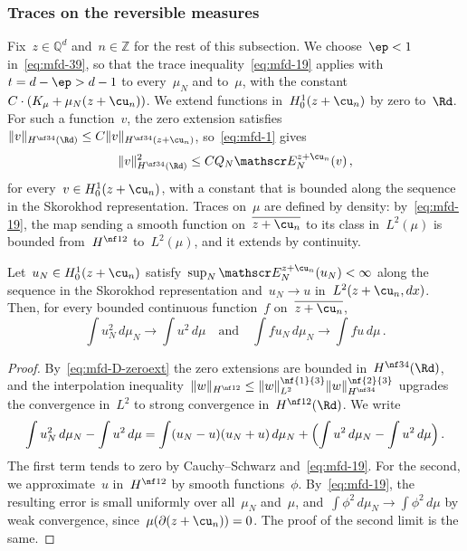 \documentclass[11pt]{amsart}
\begin{document}
\subsubsection{Traces on the reversible measures}

Fix~$z\in\mathbb Q^d$ and~$n\in\mathbb Z$ for the rest of this subsection. We choose~$\ep<1$ in~\eqref{eq:mfd-39}, so that the trace inequality~\eqref{eq:mfd-19} applies with~$t=d-\ep>d-1$ to every~$\mu_N$ and to~$\mu$, with the constant~$C\cdot(K_\mu+\mu_N(z+\cu_n))$. We extend functions in~$H^1_0(z+\cu_n)$ by zero to~$\Rd$. For such a function~$v$, the zero extension satisfies~$\|v\|_{H^{\nf34}(\Rd)}\leq C\|v\|_{H^{\nf34}(z+\cu_n)}$, so~\eqref{eq:mfd-1} gives
\begin{equation}
	\|v\|_{H^{\nf34}(\Rd)}^2\leq CQ_N\mathscr E_N^{z+\cu_n}(v)\,,
	\label{eq:mfd-D-zeroext}
\end{equation}
for every~$v\in H^1_0(z+\cu_n)$, with a constant that is bounded along the sequence in the Skorokhod representation. Traces on~$\mu$ are defined by density: by~\eqref{eq:mfd-19}, the map sending a smooth function on~$\overline{z+\cu_n}$ to its class in~$L^2(\mu)$ is bounded from~$H^{\nf12}$ to~$L^2(\mu)$, and it extends by continuity.

\begin{lemma}
\label{mfd:lem-varying-trace}
Let~$u_N\in H^1_0(z+\cu_n)$ satisfy~$\sup_N\mathscr E_N^{z+\cu_n}(u_N)<\infty$ along the sequence in the Skorokhod representation and~$u_N\to u$ in~$L^2(z+\cu_n,dx)$. Then, for every bounded continuous function~$f$ on~$\overline{z+\cu_n}$,
\begin{equation}
	\int u_N^2\,d\mu_N\longrightarrow\int u^2\,d\mu
	\quad\text{and}\quad
	\int fu_N\,d\mu_N\longrightarrow\int fu\,d\mu\,.
	\label{eq:mfd-40}
\end{equation}
\end{lemma}

\begin{proof}
By~\eqref{eq:mfd-D-zeroext} the zero extensions are bounded in~$H^{\nf34}(\Rd)$, and the interpolation inequality~$\|w\|_{H^{\nf12}}\leq\|w\|_{L^2}^{\nf{1}{3}}\|w\|_{H^{\nf34}}^{\nf{2}{3}}$ upgrades the convergence in~$L^2$ to strong convergence in~$H^{\nf12}(\Rd)$. We write
\begin{equation*}
	\int u_N^2\,d\mu_N-\int u^2\,d\mu
	=\int(u_N-u)(u_N+u)\,d\mu_N+\Bigl(\int u^2\,d\mu_N-\int u^2\,d\mu\Bigr)\,.
\end{equation*}
The first term tends to zero by Cauchy--Schwarz and~\eqref{eq:mfd-19}. For the second, we approximate~$u$ in~$H^{\nf12}$ by smooth functions~$\phi$. By~\eqref{eq:mfd-19}, the resulting error is small uniformly over all~$\mu_N$ and~$\mu$, and~$\int\phi^2\,d\mu_N\to\int\phi^2\,d\mu$ by weak convergence, since~$\mu(\partial(z+\cu_n))=0$. The proof of the second limit is the same.
\end{proof}
\end{document}
